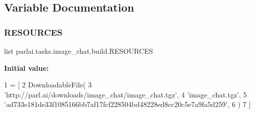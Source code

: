 \subsection{Variable Documentation}
\mbox{\label{namespaceparlai_1_1tasks_1_1image__chat_1_1build_a16b6341acb1502cb3bd80737372fd208}} 
\subsubsection{\texorpdfstring{R\+E\+S\+O\+U\+R\+C\+ES}{RESOURCES}}
{\footnotesize\ttfamily list parlai.\+tasks.\+image\+\_\+chat.\+build.\+R\+E\+S\+O\+U\+R\+C\+ES}

{\bfseries Initial value\+:}
\begin{DoxyCode}
1 =  [
2     DownloadableFile(
3         \textcolor{stringliteral}{'http://parl.ai/downloads/image\_chat/image\_chat.tgz'},
4         \textcolor{stringliteral}{'image\_chat.tgz'},
5         \textcolor{stringliteral}{'ad733e181de33f1085166bb7af17fcf228504bd48228ed8cc20c5e7a9fa5d259'},
6     )
7 ]
\end{DoxyCode}
